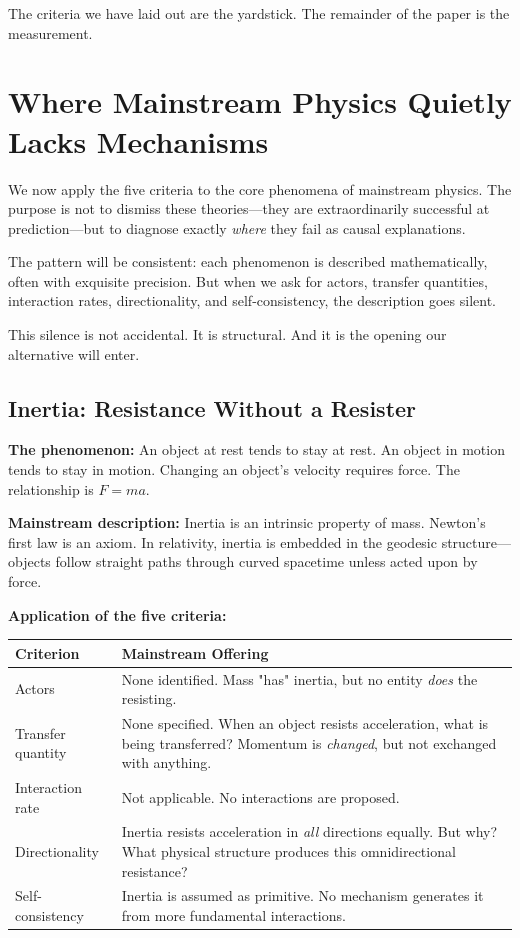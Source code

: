 \documentclass[12pt, a4paper]{article}
\begin{document}
The criteria we have laid out are the yardstick. The remainder of the paper is the measurement.

\section{Where Mainstream Physics Quietly Lacks Mechanisms}
\label{sec:mainstream_gaps}

We now apply the five criteria to the core phenomena of mainstream physics. The purpose is not to dismiss these theories—they are extraordinarily successful at prediction—but to diagnose exactly \textit{where} they fail as causal explanations.

The pattern will be consistent: each phenomenon is described mathematically, often with exquisite precision. But when we ask for actors, transfer quantities, interaction rates, directionality, and self-consistency, the description goes silent.

This silence is not accidental. It is structural. And it is the opening our alternative will enter.

\subsection{Inertia: Resistance Without a Resister}
\label{subsec:inertia_gap}

\textbf{The phenomenon:} An object at rest tends to stay at rest. An object in motion tends to stay in motion. Changing an object's velocity requires force. The relationship is \( F = ma \).

\textbf{Mainstream description:} Inertia is an intrinsic property of mass. Newton's first law is an axiom. In relativity, inertia is embedded in the geodesic structure—objects follow straight paths through curved spacetime unless acted upon by force.

\textbf{Application of the five criteria:}

\begin{center}
\begin{tabular}{|p{3cm}|p{10cm}|}
\hline
\textbf{Criterion} & \textbf{Mainstream Offering} \\
\hline
Actors & None identified. Mass "has" inertia, but no entity \textit{does} the resisting. \\
\hline
Transfer quantity & None specified. When an object resists acceleration, what is being transferred? Momentum is \textit{changed}, but not exchanged with anything. \\
\hline
Interaction rate & Not applicable. No interactions are proposed. \\
\hline
Directionality & Inertia resists acceleration in \textit{all} directions equally. But why? What physical structure produces this omnidirectional resistance? \\
\hline
Self-consistency & Inertia is assumed as primitive. No mechanism generates it from more fundamental interactions. \\
\hline
\end{tabular}
\end{center}
\end{document}
